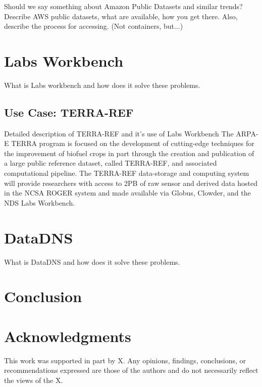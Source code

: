 \documentclass{sig-alternate}
\begin{document}
Should we say something about Amazon Public Datasets and similar trends? Describe AWS public datasets, what are available, how you get there. Also, describe the process for accessing. (Not containers, but...)

\section{Labs Workbench}

What is Labs workbench and how does it solve these problems.

\subsection{Use Case: TERRA-REF}

Detailed description of TERRA-REF and it's use of Labs Workbench
The ARPA-E TERRA program is focused on the development of cutting-edge techniques for the improvement of biofuel crops in part through the creation and publication of a large public reference dataset, called TERRA-REF, and associated computational pipeline. The TERRA-REF data-storage and computing system will provide researchers with access to 2PB of raw sensor and derived data hosted in the NCSA ROGER system and made available via Globus, Clowder, and the NDS Labs Workbench.  

\section{DataDNS}

What is DataDNS and how does it solve these problems.

\section{Conclusion}




\section{Acknowledgments}
This work was supported in part by X. Any opinions, findings, conclusions, or recommendations expressed are those of the authors and do not necessarily reflect the views of the X.


  
\end{document}
